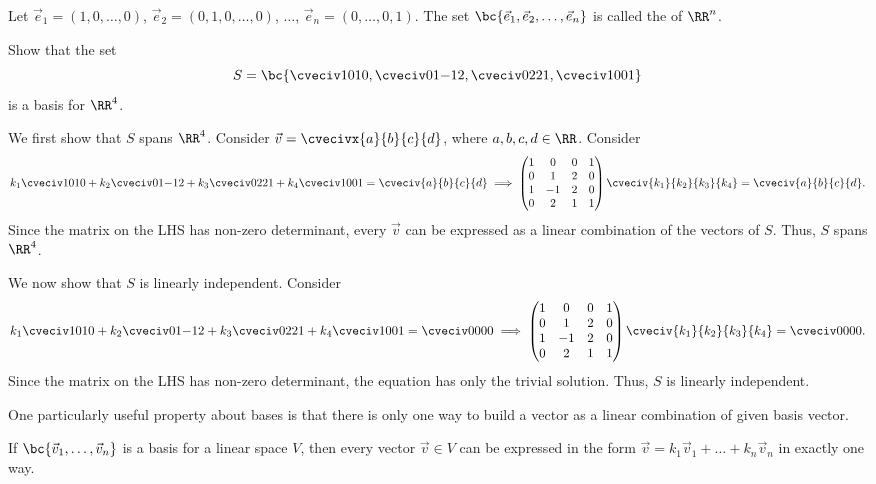 \begin{definition}
    Let $\vec e_1 = (1, 0, \dots, 0)$, $\vec e_2 = (0, 1, 0, \dots, 0)$, $\dots$, $\vec e_n = (0, \dots, 0, 1)$. The set $\bc{\vec e_1, \vec e_2, \dots, \vec e_n}$ is called the  of $\RR^n$.
\end{definition}

\begin{sample}
    Show that the set \[S = \bc{\cveciv1010, \cveciv01{-1}2, \cveciv0221, \cveciv1001}\] is a basis for $\RR^4$.
\end{sample}
\begin{sampans}
    We first show that $S$ spans $\RR^4$. Consider $\vec v = \cvecivx{a}{b}{c}{d}$, where $a, b, c, d \in \RR$. Consider \[k_1 \cveciv1010 + k_2 \cveciv01{-1}2 + k_3 \cveciv0221 + k_4 \cveciv1001 = \cveciv{a}{b}{c}{d} \implies \begin{pmatrix}1 & 0 & 0 & 1\\ 0 & 1 & 2 & 0 \\ 1 & -1 & 2 & 0 \\ 0 & 2 & 1 & 1\end{pmatrix}\cveciv{k_1}{k_2}{k_3}{k_4} = \cveciv{a}{b}{c}{d}.\] Since the matrix on the LHS has non-zero determinant, every $\vec v$ can be expressed as a linear combination of the vectors of $S$. Thus, $S$ spans $\RR^4$.

    We now show that $S$ is linearly independent. Consider \[k_1 \cveciv1010 + k_2 \cveciv01{-1}2 + k_3 \cveciv0221 + k_4 \cveciv1001 = \cveciv0000 \implies \begin{pmatrix}1 & 0 & 0 & 1\\ 0 & 1 & 2 & 0 \\ 1 & -1 & 2 & 0 \\ 0 & 2 & 1 & 1\end{pmatrix}\cveciv{k_1}{k_2}{k_3}{k_4} = \cveciv0000.\] Since the matrix on the LHS has non-zero determinant, the equation has only the trivial solution. Thus, $S$ is linearly independent.
\end{sampans}

One particularly useful property about bases is that there is only one way to build a vector as a linear combination of given basis vector.

\begin{theorem}
    If $\bc{\vec v_1, \dots, \vec v_n}$ is a basis for a linear space $V$, then every vector $\vec v \in V$ can be expressed in the form $\vec v = k_1 \vec v_1 + \dots + k_n \vec v_n$ in exactly one way.
\end{theorem}


